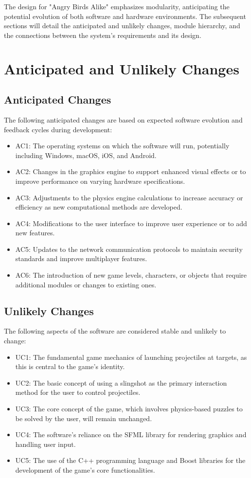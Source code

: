 \documentclass[12pt]{article}
\begin{document}
The design for "Angry Birds Alike" emphasizes modularity, anticipating the potential evolution of both software and hardware environments. The subsequent sections will detail the anticipated and unlikely changes, module hierarchy, and the connections between the system's requirements and its design.

\section{Anticipated and Unlikely Changes}

\subsection{Anticipated Changes}
The following anticipated changes are based on expected software evolution and feedback cycles during development:

\begin{itemize}
    \item AC1: The operating systems on which the software will run, potentially including Windows, macOS, iOS, and Android.
    \item AC2: Changes in the graphics engine to support enhanced visual effects or to improve performance on varying hardware specifications.
    \item AC3: Adjustments to the physics engine calculations to increase accuracy or efficiency as new computational methods are developed.
    \item AC4: Modifications to the user interface to improve user experience or to add new features.
    \item AC5: Updates to the network communication protocols to maintain security standards and improve multiplayer features.
    \item AC6: The introduction of new game levels, characters, or objects that require additional modules or changes to existing ones.
\end{itemize}

\subsection{Unlikely Changes}
The following aspects of the software are considered stable and unlikely to change:

\begin{itemize}
    \item UC1: The fundamental game mechanics of launching projectiles at targets, as this is central to the game's identity.
    \item UC2: The basic concept of using a slingshot as the primary interaction method for the user to control projectiles.
    \item UC3: The core concept of the game, which involves physics-based puzzles to be solved by the user, will remain unchanged.
    \item UC4: The software's reliance on the SFML library for rendering graphics and handling user input.
    \item UC5: The use of the C++ programming language and Boost libraries for the development of the game's core functionalities.
\end{itemize}
\end{document}
